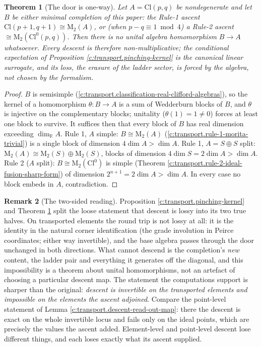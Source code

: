 \documentclass[11pt]{article}
\newtheorem{theorem}{Theorem}[section]
\theoremstyle{definition}
\newtheorem{remark}[theorem]{Remark}
\theoremstyle{plain}
\providecommand{\Cl}{}\renewcommand{\Cl}{\mathrm{Cl}}
\providecommand{\Mat}{}\renewcommand{\Mat}{\mathrm{M}}
\providecommand{\R}{}\renewcommand{\R}{\mathbb{R}}
\begin{document}
\begin{theorem}[The door is one-way]\label{c:transport.door-one-way}
Let $A = \Cl(p,q)$ be nondegenerate and let $B$ be either minimal completion of this paper: the Rule-1 ascent $\Cl(p{+}1,q{+}1) \cong \Mat_2(A)$, or (when $p - q \equiv 1 \bmod 4$) a Rule-2 ascent $\cong \Mat_2(\Cl^0(p,q))$. Then there is no unital algebra homomorphism $B \to A$ whatsoever. Every descent is therefore non-multiplicative; the conditional expectation of Proposition \ref{c:transport.pinching-kernel} is the canonical linear surrogate, and its loss, the erasure of the ladder sector, is forced by the algebra, not chosen by the formalism.
\end{theorem}
\begin{proof}
$B$ is semisimple (\ref{c:transport.classification-real-clifford-algebras}), so the kernel of a homomorphism $\theta : B \to A$ is a sum of Wedderburn blocks of $B$, and $\theta$ is injective on the complementary blocks; unitality ($\theta(1) = 1 \neq 0$) forces at least one block to survive. It suffices then that every block of $B$ has real dimension exceeding $\dim_\R A$. Rule 1, $A$ simple: $B \cong \Mat_2(A)$ (\ref{c:transport.rule-1-morita-trivial}) is a single block of dimension $4 \dim A > \dim A$. Rule 1, $A = S \oplus S$ split: $\Mat_2(A) \cong \Mat_2(S) \oplus \Mat_2(S)$, blocks of dimension $4 \dim S = 2 \dim A > \dim A$. Rule 2 ($A$ split): $B \cong \Mat_2(\Cl^0)$ is simple (Theorem \ref{c:transport.rule-2-ideal-fusion-sharp-form}) of dimension $2^{n+1} = 2\dim A > \dim A$. In every case no block embeds in $A$, contradiction.

\end{proof}

\begin{remark}[The two-sided reading]\label{c:note.transport.two-sided-reading}
Proposition \ref{c:transport.pinching-kernel} and Theorem \ref{c:transport.door-one-way} split the loose statement that descent is lossy into its two true halves. On transported elements the round trip is not lossy at all: it is the identity in the natural corner identification (the grade involution in Peirce coordinates; either way invertible), and the base algebra passes through the door unchanged in both directions. What cannot descend is the completion's \emph{new} content, the ladder pair and everything it generates off the diagonal, and this impossibility is a theorem about unital homomorphisms, not an artefact of choosing a particular descent map. The statement the computations support is sharper than the original: \emph{descent is invertible on the transported elements and impossible on the elements the ascent adjoined}. Compare the point-level statement of Lemma \ref{c:transport.descent-read-out-map}: there the descent is exact on the whole invertible locus and fails only on the ideal points, which are precisely the values the ascent added. Element-level and point-level descent lose different things, and each loses exactly what its ascent supplied.
\end{remark}
\end{document}
